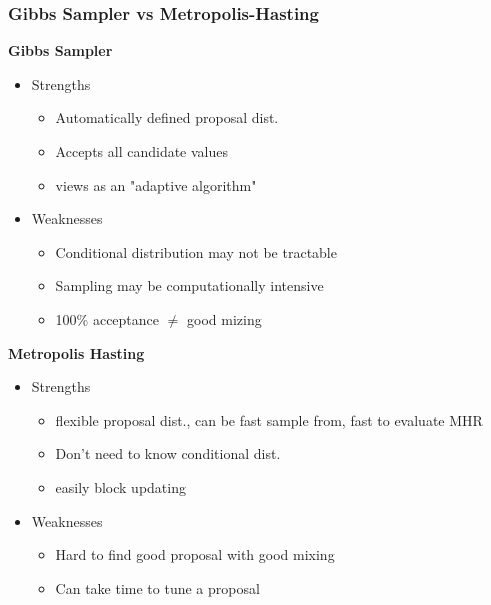 \documentclass[12pt]{article}
\theoremstyle{definition}
\begin{document}
        \subsubsection*{Gibbs Sampler vs Metropolis-Hasting}
            \begin{multicols*}{2}
                \textbf{Gibbs Sampler}
                \begin{itemize}
                    \item Strengths
                    \begin{itemize}[topsep = 0pt]
                        \item Automatically defined proposal dist.
                        \item Accepts all candidate values
                        \item views as an "adaptive algorithm"
                    \end{itemize}
                    \item Weaknesses
                    \begin{itemize}[topsep = 0pt]
                        \item Conditional distribution may not be tractable
                        \item Sampling may be computationally intensive
                        \item 100\% acceptance $\neq$ good mizing
                    \end{itemize}
                \end{itemize}
                \vfill\null
                \columnbreak
                \textbf{Metropolis Hasting}
                \begin{itemize}
                    \item Strengths
                    \begin{itemize}[topsep = 0pt]
                        \item flexible proposal dist., can be fast sample from, fast to evaluate MHR
                        \item Don't need to know conditional dist.
                        \item easily block updating
                    \end{itemize}
                    \item Weaknesses
                    \begin{itemize}[topsep = 0pt]
                        \item Hard to find good proposal with good mixing
                        \item Can take time to tune a proposal
                    \end{itemize}
                \end{itemize}
            \end{multicols*}
\end{document}

